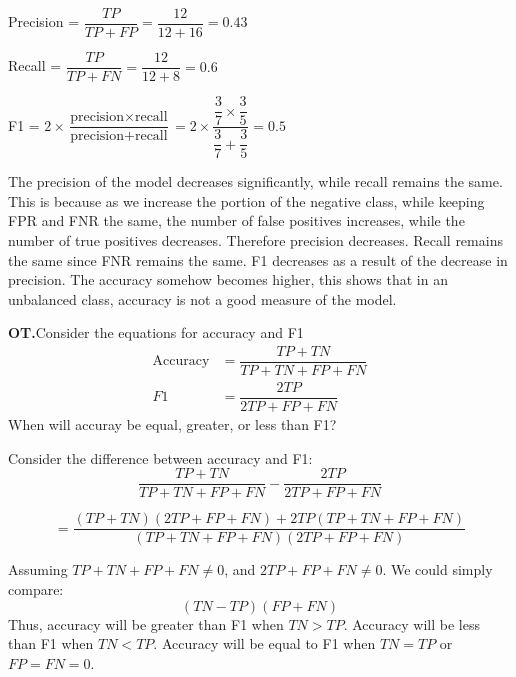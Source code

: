 \documentclass{article}
\newcounter{problem}
\newcounter{extraproblem}
\newcommand{\extraquestion}[1]{\refstepcounter{extraproblem}\par\smallskip\textbf{OT\theextraproblem.}\quad #1\par\smallskip}
\begin{document}
Precision = \(\dfrac{TP}{TP+FP} = \dfrac{12}{12+16} = 0.43\)

Recall = \(\dfrac{TP}{TP+FN} = \dfrac{12}{12+8} = 0.6\)

F1 = \(2 \times \dfrac{\text{precision} \times \text{recall}}{\text{precision} + \text{recall}} = 2 \times \dfrac{\dfrac37 \times \dfrac35}{\dfrac37 + \dfrac35} = 0.5\)

The precision of the model decreases significantly, while recall remains the same. This is because as we increase the portion of the negative class, while keeping FPR and FNR the same,
the number of false positives increases, while the number of true positives decreases. Therefore precision decreases. Recall remains the same since FNR remains the same.
F1 decreases as a result of the decrease in precision. The accuracy somehow becomes higher, this shows that in an unbalanced class, accuracy is not a good measure of the model.

\extraquestion{Consider the equations for accuracy and F1
    \begin{align*}
        \text{Accuracy} & = \dfrac{TP+TN}{TP+TN+FP+FN} \\
        F1              & = \dfrac{2TP}{2TP+FP+FN}
    \end{align*}
    When will accuray be equal, greater, or less than F1?
}
Consider the difference between accuracy and F1:
\begin{equation*}
    \label{eq:1}
    \dfrac{TP+TN}{TP+TN+FP+FN}-\dfrac{2TP}{2TP+FP+FN}
\end{equation*}

\[=\dfrac{(TP+TN)(2TP+FP+FN)+2TP(TP+TN+FP+FN)}{(TP+TN+FP+FN)(2TP+FP+FN)}\]

Assuming \(TP+TN+FP+FN \neq 0\), and \(2TP+FP+FN \neq 0\). We could simply compare:
\[(TN-TP)(FP+FN)\]
Thus, accuracy will be greater than F1 when \(TN>TP\). Accuracy will be less than F1 when \(TN<TP\). Accuracy will be equal to F1 when \(TN=TP\) or \(FP=FN=0\).
\end{document}
